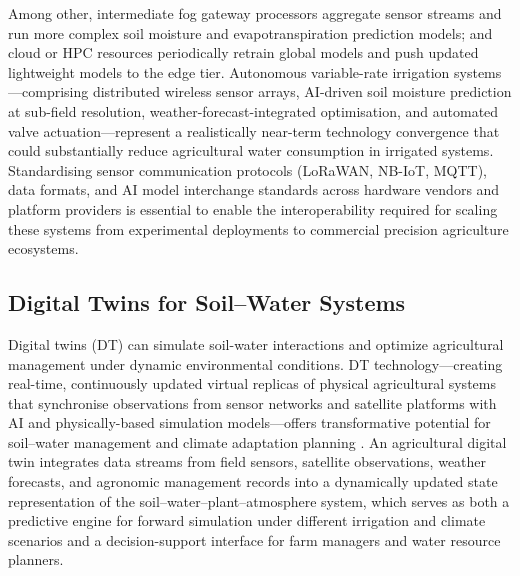 \documentclass[land,article,submit,pdftex,moreauthors]{Definitions/mdpi}
\numberwithin{equation}{section}
\begin{document}
Among other, intermediate fog gateway processors aggregate sensor streams and run more complex soil moisture and evapotranspiration prediction models; and cloud or HPC resources periodically retrain global models and push updated lightweight models to the edge tier. Autonomous variable-rate irrigation systems---comprising distributed wireless sensor arrays, AI-driven soil moisture prediction at sub-field resolution, weather-forecast-integrated optimisation, and automated valve actuation---represent a realistically near-term technology convergence that could substantially reduce agricultural water consumption in irrigated systems. Standardising sensor communication protocols (LoRaWAN, NB-IoT, MQTT), data formats, and AI model interchange standards across hardware vendors and platform providers is essential to enable the interoperability required for scaling these systems from experimental deployments to commercial precision agriculture ecosystems.

\subsection{Digital Twins for Soil--Water Systems}

Digital twins (DT) can simulate soil-water interactions and optimize agricultural management under dynamic environmental conditions. DT technology---creating real-time, continuously updated virtual replicas of physical agricultural systems that synchronise observations from sensor networks and satellite platforms with AI and physically-based simulation models---offers transformative potential for soil--water management and climate adaptation planning \citep{pylianidis2021digital}. An agricultural digital twin integrates data streams from field sensors, satellite observations, weather forecasts, and agronomic management records into a dynamically updated state representation of the soil--water--plant--atmosphere system, which serves as both a predictive engine for forward simulation under different irrigation and climate scenarios and a decision-support interface for farm managers and water resource planners. 
\end{document}
